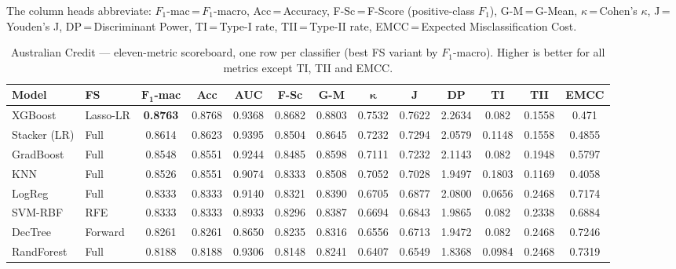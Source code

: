 The column heads abbreviate:
$F_1$-mac\,=\,$F_1$-macro, Acc\,=\,Accuracy,
F-Sc\,=\,F-Score (positive-class $F_1$), G-M\,=\,G-Mean,
$\kappa$\,=\,Cohen's $\kappa$, J\,=\,Youden's J,
DP\,=\,Discriminant Power, TI\,=\,Type-I rate,
TII\,=\,Type-II rate, EMCC\,=\,Expected Misclassification Cost.

\begin{table}[H]
\centering
\caption{Australian Credit --- eleven-metric scoreboard, one row per
classifier (best FS variant by $F_1$-macro). Higher is better for
all metrics except TI, TII and EMCC.}
\singlespacing
\label{tab:11m-aus}
\scriptsize
\setlength{\tabcolsep}{3.5pt}
\renewcommand{\arraystretch}{1.15}
\begin{tabular}{l l c c c c c c c c c c c}
\toprule
\textbf{Model} & \textbf{FS} & $\boldsymbol{F_1}$\textbf{-mac} & \textbf{Acc} & \textbf{AUC} & \textbf{F-Sc} & \textbf{G-M} & $\boldsymbol{\kappa}$ & \textbf{J} & \textbf{DP} & \textbf{TI} & \textbf{TII} & \textbf{EMCC}\\
\midrule
XGBoost      & Lasso-LR & \textbf{0.8763} & 0.8768 & 0.9368 & 0.8682 & 0.8803 & 0.7532 & 0.7622 & 2.2634 & 0.082  & 0.1558 & 0.471\\
Stacker (LR) & Full     & 0.8614 & 0.8623 & 0.9395 & 0.8504 & 0.8645 & 0.7232 & 0.7294 & 2.0579 & 0.1148 & 0.1558 & 0.4855\\
GradBoost    & Full     & 0.8548 & 0.8551 & 0.9244 & 0.8485 & 0.8598 & 0.7111 & 0.7232 & 2.1143 & 0.082  & 0.1948 & 0.5797\\
KNN          & Full     & 0.8526 & 0.8551 & 0.9074 & 0.8333 & 0.8508 & 0.7052 & 0.7028 & 1.9497 & 0.1803 & 0.1169 & 0.4058\\
LogReg       & Full     & 0.8333 & 0.8333 & 0.9140 & 0.8321 & 0.8390 & 0.6705 & 0.6877 & 2.0800 & 0.0656 & 0.2468 & 0.7174\\
SVM-RBF      & RFE      & 0.8333 & 0.8333 & 0.8933 & 0.8296 & 0.8387 & 0.6694 & 0.6843 & 1.9865 & 0.082  & 0.2338 & 0.6884\\
DecTree      & Forward  & 0.8261 & 0.8261 & 0.8650 & 0.8235 & 0.8316 & 0.6556 & 0.6713 & 1.9472 & 0.082  & 0.2468 & 0.7246\\
RandForest   & Full     & 0.8188 & 0.8188 & 0.9306 & 0.8148 & 0.8241 & 0.6407 & 0.6549 & 1.8368 & 0.0984 & 0.2468 & 0.7319\\
\bottomrule
\end{tabular}
\end{table}


